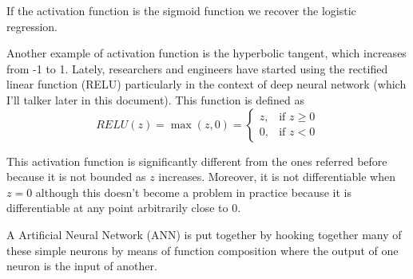 \documentclass{article}
\begin{document}
If the activation function is the sigmoid function we recover the logistic regression.

Another example of activation function is the hyperbolic tangent, which increases from -1 to 1. 
Lately, researchers and engineers have started using the rectified linear function (RELU) particularly in the context of deep neural network (which I'll talker later in this document). This function is defined as
\begin{equation}
RELU(z)= \max(z,0) = 
\begin{cases}
    z,& \text{if } z\geq 0\\
    0,              & \text{if } z < 0
\end{cases}
\end{equation}

This activation function is significantly different from the ones referred before because it is not bounded as $z$ increases. Moreover, it is not differentiable when $z=0$ although this doesn't become a problem in practice because it is differentiable at any point arbitrarily close to 0.

A Artificial Neural Network (ANN) is put together by hooking together many of these simple neurons by means of function composition where the output of one neuron is the input of another.
\end{document}
